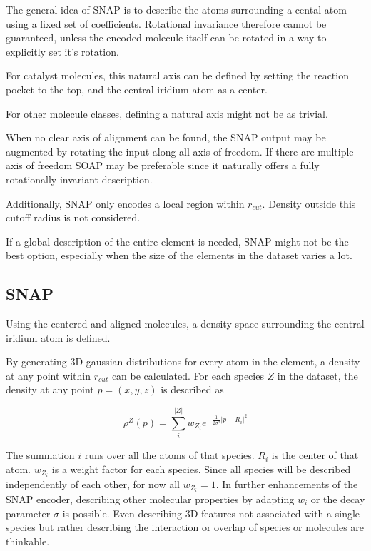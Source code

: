 The general idea of SNAP is to describe the atoms surrounding a cental atom using a fixed set of coefficients.
Rotational invariance therefore cannot be guaranteed, unless the encoded molecule itself can be rotated in a way to explicitly set it's rotation.

For catalyst molecules, this natural axis can be defined by setting the reaction pocket to the top, and the central iridium atom as a center.

For other molecule classes, defining a natural axis might not be as trivial.

When no clear axis of alignment can be found, the SNAP output may be augmented by rotating the input along all axis of freedom.
If there are multiple axis of freedom SOAP may be preferable since it naturally offers a fully rotationally invariant description.

Additionally, SNAP only encodes a local region within $r_{cut}$.
Density outside this cutoff radius is not considered.

If a global description of the entire element is needed, SNAP might not be the best option, especially when 
the size of the elements in the dataset varies a lot.

\subsection{SNAP}

Using the centered and aligned molecules, a density space surrounding the central iridium atom is defined.

By generating 3D gaussian distributions for every atom in the element, a density at any point within $r_{cut}$ can be calculated.
For each species $Z$ in the dataset, the density at any point $p = (x,y,z)$ is described as

$$\rho^Z(p) = \sum_i^{|Z|} w_{Z_i} e^{- \frac{1}{2\sigma^2} \vert p - R_i \vert^2 }$$  %

The summation $i$ runs over all the atoms of that species.
$R_i$ is the center of that atom.
$w_{Z_i}$ is a weight factor for each species. 
Since all species will be described independently of each other, for now all $w_{Z_i}=1$.
In further enhancements of the SNAP encoder, describing other molecular properties by adapting $w_{i}$ or the decay parameter $\sigma$ is possible.
Even describing 3D features not associated with a single species but rather describing the interaction or overlap of species 
or molecules are thinkable.

